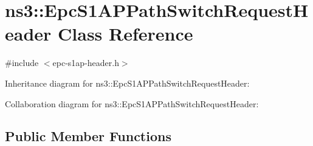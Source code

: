\hypertarget{classns3_1_1EpcS1APPathSwitchRequestHeader}{}\section{ns3\+:\+:Epc\+S1\+A\+P\+Path\+Switch\+Request\+Header Class Reference}
\label{classns3_1_1EpcS1APPathSwitchRequestHeader}


{\ttfamily \#include $<$epc-\/s1ap-\/header.\+h$>$}



Inheritance diagram for ns3\+:\+:Epc\+S1\+A\+P\+Path\+Switch\+Request\+Header\+:


Collaboration diagram for ns3\+:\+:Epc\+S1\+A\+P\+Path\+Switch\+Request\+Header\+:
\subsection*{Public Member Functions}
